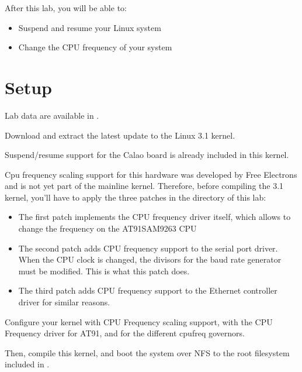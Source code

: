 
After this lab, you will be able to:

\begin{itemize}
\item Suspend and resume your Linux system
\item Change the CPU frequency of your system
\end{itemize}

\section{Setup}

Lab data are available in .

Download and extract the latest update to the Linux 3.1 kernel.

Suspend/resume support for the Calao board is already included in this
kernel.

Cpu frequency scaling support for this hardware was developed by Free
Electrons and is not yet part of the mainline kernel. Therefore,
before compiling the 3.1 kernel, you'll have to apply the three
patches in the  directory of this lab:

\begin{itemize}

\item The first patch implements the CPU frequency driver itself,
  which allows to change the frequency on the AT91SAM9263 CPU

\item The second patch adds CPU frequency support to the serial port
  driver. When the CPU clock is changed, the divisors for the baud
  rate generator must be modified. This is what this patch does.

\item The third patch adds CPU frequency support to the Ethernet
  controller driver for similar reasons.

\end{itemize}

Configure your kernel with CPU Frequency scaling support, with the CPU
Frequency driver for AT91, and for the different cpufreq governors.

Then, compile this kernel, and boot the system over NFS to the root
filesystem included
in .

